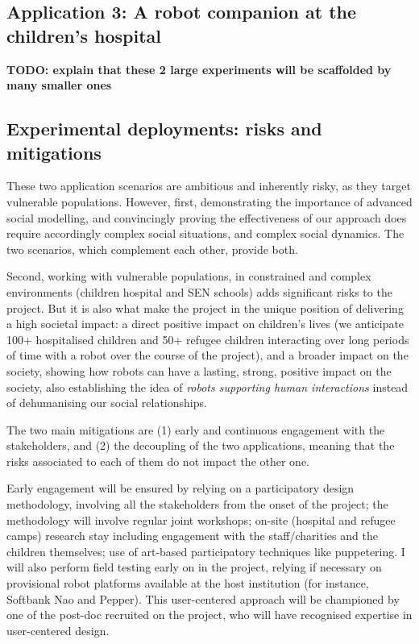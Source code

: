 \documentclass[11pt]{report}
\newcommand{\TODO}[1]{{\color{red}\textbf{TODO: #1}}}
\begin{document}
\subsection{Application 3: A robot companion at the children's hospital}


\TODO{explain that these 2 large experiments will be scaffolded by many smaller
ones}

\subsection{Experimental deployments: risks and mitigations}

These two application scenarios are ambitious and inherently risky, as they
target vulnerable populations. However, first, demonstrating the
importance of advanced social modelling, and convincingly proving the
effectiveness of our approach does require accordingly complex social
situations, and complex social dynamics. The two scenarios, which complement
each other, provide both.

Second, working with vulnerable populations, in constrained and complex
environments (children hospital and SEN schools) adds significant risks to the
project. But it is also what make the project in the unique position of
delivering a high societal impact: a direct positive impact on children's
lives (we anticipate 100+ hospitalised children and 50+ refugee children
interacting over long periods of time with a robot over the course of the
project), and a broader impact on the society, showing how robots can have a
lasting, strong, positive impact on the society, also establishing the idea of
\emph{robots supporting human interactions} instead of dehumanising our social
relationships.

The two main mitigations are (1) early and continuous engagement with the
stakeholders, and (2) the decoupling of the two applications, meaning that the
risks associated to each of them do not impact the other one.

Early engagement will be ensured by relying on a participatory design
methodology, involving all the stakeholders from the onset of the project; the
methodology will involve regular joint workshops; on-site (hospital and refugee
camps) research stay including engagement with the staff/charities and the
children themselves; use of art-based participatory techniques like puppetering.
I will also perform field testing early on in the project, relying if necessary
on provisional robot platforms available at the host institution (for instance,
Softbank Nao and Pepper). This user-centered approach will be championed by one
of the post-doc recruited on the project, who will have recognised expertise in
user-centered design.
\end{document}
